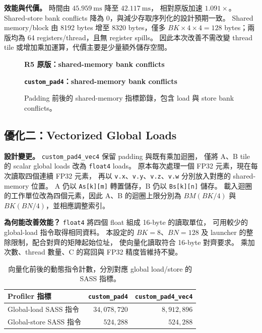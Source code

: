 \documentclass[UTF8,fontset=none,11pt,a4paper]{ctexart}
\begin{document}
\textbf{效能與代價。}
時間由 $45.959\ \mathrm{ms}$ 降至 $42.117\ \mathrm{ms}$，
相對原版加速 $1.091\times$。
Shared-store bank conflicts 降為 0，與減少存取序列化的設計預期一致。
Shared memory/block 由 8192 bytes 增至 8320 bytes，僅多
$BK\times4\times4=128$ bytes；兩版均為 64 registers/thread，且無 register spills。
因此本次改善不需改變 thread tile 或增加乘加運算，代價主要是少量額外儲存空間。

\begin{figure}[H]
\centering
{\small\textbf{R5 原版：shared-memory bank conflicts}}\par\smallskip
{}\par\medskip
{\small\textbf{\texttt{custom\_pad4}：shared-memory bank conflicts}}\par\smallskip
{}
\caption{Padding 前後的 shared-memory 指標節錄，包含 load 與 store bank conflicts。}
\end{figure}

\clearpage
\subsection*{優化二：Vectorized Global Loads}

\textbf{設計變更。}
\texttt{custom\_pad4\_vec4} 保留 padding 與既有乘加迴圈，
僅將 A、B tile 的 scalar global loads 改為 \texttt{float4} loads。
原本每次處理一個 FP32 元素，現在每次讀取四個連續 FP32 元素，
再以 \texttt{v.x}、\texttt{v.y}、\texttt{v.z}、\texttt{v.w}
分別放入對應的 shared-memory 位置。
A 仍以 \texttt{As[k][m]} 轉置儲存，B 仍以 \texttt{Bs[k][n]} 儲存。
載入迴圈的工作單位改為四個元素，因此 A、B 的迴圈上限分別為
$BM(BK/4)$ 與 $BK(BN/4)$，並相應調整索引。

\textbf{為何能改善效能？}
\texttt{float4} 將四個 float 組成 16-byte 的讀取單位，
可用較少的 global-load 指令取得相同資料。
本設定的 $BK=8$、$BN=128$ 及 launcher 的整除限制，配合對齊的矩陣起始位址，
使向量化讀取符合 16-byte 對齊要求。
乘加次數、thread 數量、C 的寫回與 FP32 精度皆維持不變。

\begin{table}[H]
\centering
\small
\begin{tabular}{@{}lrr@{}}
\toprule
Profiler 指標 & \texttt{custom\_pad4} & \texttt{custom\_pad4\_vec4} \\
\midrule
Global-load SASS 指令 & $34{,}078{,}720$ & $8{,}912{,}896$ \\
Global-store SASS 指令 & $524{,}288$ & $524{,}288$ \\
\bottomrule
\end{tabular}
\caption{向量化前後的動態指令計數，分別對應 global load/store 的 SASS 指標。}
\end{table}
\end{document}

